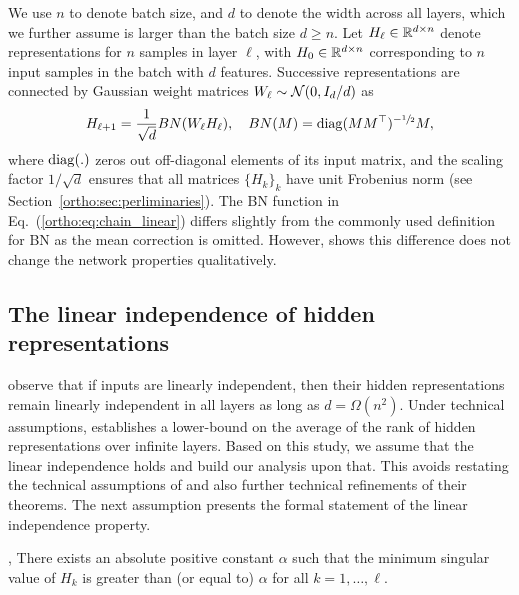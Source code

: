 We use $n$ to denote batch size, and $d$ to denote the width across all layers, which we further assume is larger than the batch size $d\geq n$. Let $H_\ell \in \mathbb{R}^{d\times n}$ denote representations for $n$ samples in layer $\ell$, with $H_0 \in \mathbb{R}^{d \times n}$ corresponding to $n$ input samples in the batch with $d$ features. Successive representations are connected by Gaussian weight matrices $W_\ell\sim\mathcal{N}(0,I_d/d)$ as 
\begin{align}
    \label{ortho:eq:chain_linear}
    H_{\ell+1} = \frac{1}{\sqrt{d}} BN(W_{\ell} H_{\ell}), \quad BN(M) = \mathrm{diag}(M M^\top)^{-\sfrac{1}{2}} M,
\end{align}
where $\mathrm{diag}(.)$ zeros out off-diagonal elements of its input matrix, and the scaling factor $1/\sqrt{d}$ ensures that all matrices $\{H_k\}_{k}$ have unit Frobenius norm (see Section~\ref{ortho:sec:perliminaries}). The BN function in Eq.~(\ref{ortho:eq:chain_linear}) differs slightly from the commonly used definition for BN as the mean correction is omitted. However, \cite{daneshmand2020batch} shows this difference does not change the network properties qualitatively. 

\subsection{The linear independence of hidden representations}
\cite{daneshmand2020batch} observe that if inputs are linearly independent, then their hidden representations remain linearly independent in all layers as long as $d = \Omega(n^2)$. Under technical assumptions, \cite{daneshmand2020batch} establishes a lower-bound on the average of the rank of hidden representations over infinite layers. Based on this study, we assume that the linear independence holds and build our analysis upon that. This avoids restating the technical assumptions of \cite{daneshmand2020batch} and also further technical refinements of their theorems. The next assumption presents the formal statement of the linear independence property.
 \begin{assumptioncost}{1}{\alpha,\ell}
 \label{ortho:assume:lineary_indepdence}
 There exists an absolute positive constant $\alpha$ such that the minimum singular value of $H_k$ is greater than (or equal to) $\alpha$  for all $k=1,\dots, \ell$.
\end{assumptioncost}
 

